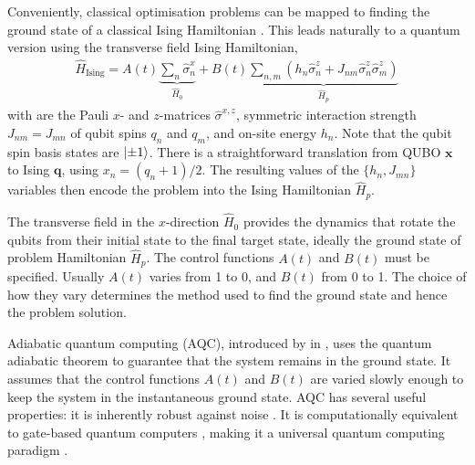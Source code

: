 \documentclass[10pt]{iopart}
\begin{document}
Conveniently, classical optimisation problems can be mapped to finding the ground state of a classical Ising Hamiltonian \cite{Lucas2014,Choi2010}.  This leads naturally to a quantum version using the transverse field Ising Hamiltonian,
\begin{align}
\hat{H}_\text{Ising} = A(t) \underbrace{\sum_n \hat{\sigma}^x_n}_{\hat{H}_0} + 
B(t) \underbrace{\sum_{n,m} 
\left( 
h_n \hat{\sigma}^z_n + 
J_{nm} \hat{\sigma}^z_n \hat{\sigma}^z_m 
\right)}_{\hat{H}_p}
\end{align}
with are the Pauli $x$- and $z$-matrices $\hat{\sigma}^{x,z}$, symmetric interaction strength $J_{nm}=J_{mn}$ of qubit spins $q_n$ and $q_m$, and on-site energy $h_n$. Note that the qubit spin basis states are $\ket{\pm 1}$. There is a straightforward translation from QUBO $\mathbf{x}$ to Ising $\mathbf{q}$, using $x_n = (q_n+1)/2$. The resulting values of the $\{h_n, J_{mn}\}$ variables then encode the problem into the Ising Hamiltonian $\hat{H}_p$.

The transverse field in the $x$-direction $\hat{H}_0$ provides the dynamics that rotate the qubits from their initial state to the final target state, ideally the ground state of problem Hamiltonian $\hat{H}_p$. The control functions $A(t)$ and $B(t)$ must be specified. Usually $A(t)$ varies from 1 to 0, and $B(t)$ from 0 to 1. The choice of how they vary determines the method used to find the ground state and hence the problem solution.

Adiabatic quantum computing (AQC), introduced by \citeauthor{Farhi2001} \cite{Farhi2001} in \citeyear{Farhi2001}, uses the quantum adiabatic theorem to guarantee that the system remains in the ground state. It assumes that the control functions $A(t)$ and $B(t)$ are varied slowly enough to keep the system in the instantaneous ground state. AQC has several useful properties: it is inherently robust against noise \cite{Childs2001}. It is computationally equivalent to gate-based quantum computers \cite{Aharonov2004}, making it a universal quantum computing paradigm \cite{Aharonov2008}. 
\end{document}
